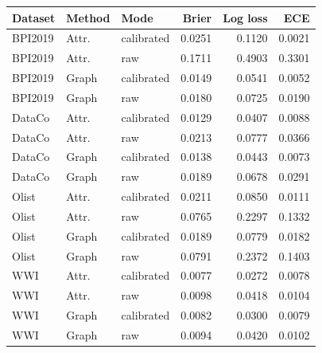 \begin{tabular}{lllrrr}
\toprule
Dataset & Method & Mode & Brier & Log loss & ECE \\
\midrule
BPI2019 & Attr. & calibrated & 0.0251 & 0.1120 & 0.0021 \\
BPI2019 & Attr. & raw & 0.1711 & 0.4903 & 0.3301 \\
BPI2019 & Graph & calibrated & 0.0149 & 0.0541 & 0.0052 \\
BPI2019 & Graph & raw & 0.0180 & 0.0725 & 0.0190 \\
DataCo & Attr. & calibrated & 0.0129 & 0.0407 & 0.0088 \\
DataCo & Attr. & raw & 0.0213 & 0.0777 & 0.0366 \\
DataCo & Graph & calibrated & 0.0138 & 0.0443 & 0.0073 \\
DataCo & Graph & raw & 0.0189 & 0.0678 & 0.0291 \\
Olist & Attr. & calibrated & 0.0211 & 0.0850 & 0.0111 \\
Olist & Attr. & raw & 0.0765 & 0.2297 & 0.1332 \\
Olist & Graph & calibrated & 0.0189 & 0.0779 & 0.0182 \\
Olist & Graph & raw & 0.0791 & 0.2372 & 0.1403 \\
WWI & Attr. & calibrated & 0.0077 & 0.0272 & 0.0078 \\
WWI & Attr. & raw & 0.0098 & 0.0418 & 0.0104 \\
WWI & Graph & calibrated & 0.0082 & 0.0300 & 0.0079 \\
WWI & Graph & raw & 0.0094 & 0.0420 & 0.0102 \\
\bottomrule
\end{tabular}
